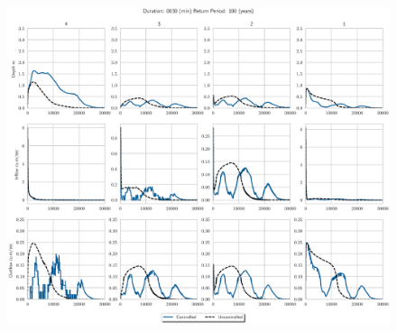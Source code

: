 \begin{figure}
    \centering
    \includegraphics[width=\linewidth]{./RL-SI-figures/77storms/0030100.eps}
\end{figure}





